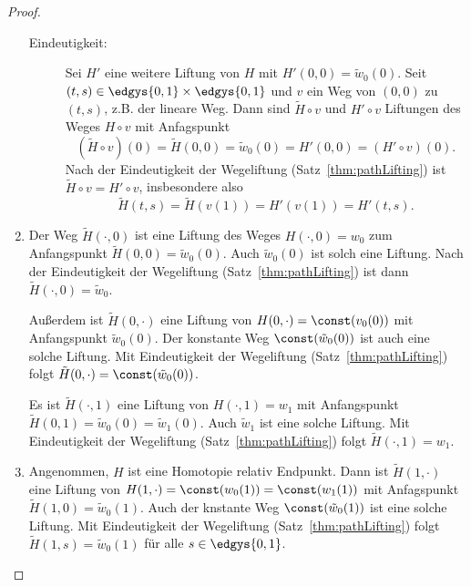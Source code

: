 \documentclass[language=ngerman]{TemplateLecture} %
\begin{document}
\begin{proof}
\begin{enumerate}[$(i)$:]
\begin{description}
            \item[Eindeutigkeit:] Sei $H'$ eine weitere Liftung von $H$ mit $H'(0,0) = \tilde{w}_0(0)$. Seit $(t,s) \in \edgys{0,1} \times \edgys{0,1}$ und $v$ ein Weg von $(0,0)$ zu $(t,s)$, z.B. der lineare Weg. Dann sind $\tilde{H} \circ v$ und $H' \circ v$ Liftungen des Weges $H \circ v$ mit Anfagspunkt 
            \begin{equation*}
                (\tilde{H} \circ v)(0) = \tilde{H}(0,0) = \tilde{w}_0(0) = H'(0,0) = (H' \circ v)(0).
            \end{equation*} 
            Nach der Eindeutigkeit der Wegeliftung (Satz~\ref{thm:pathLifting}) ist $\tilde{H} \circ v = H' \circ v$, insbesondere also 
            \begin{equation*}
                \tilde{H}(t, s) = \tilde{H}(v(1)) = H'(v(1)) = H'(t, s).
            \end{equation*}
        \end{description}
        \item Der Weg $\tilde{H}(\cdot, 0)$ ist eine Liftung des Weges $H(\cdot, 0) = w_0$ zum Anfangspunkt $\tilde{H}(0,0) = \tilde{w}_0(0)$. Auch $\tilde{w}_0(0)$ ist solch eine Liftung. Nach der Eindeutigkeit der Wegeliftung (Satz~\ref{thm:pathLifting}) ist dann $\tilde{H}(\cdot, 0) = \tilde{w}_0$.
        
        Außerdem ist $\tilde{H}(0,\cdot)$ eine Liftung von $H(0, \cdot) = \const(v_0(0))$ mit Anfangspunkt $\tilde{w}_0(0)$. Der konstante Weg $\const(\tilde{w}_0(0))$ ist auch eine solche Liftung. Mit Eindeutigkeit der Wegeliftung (Satz~\ref{thm:pathLifting}) folgt $\tilde{H}(0, \cdot) = \const(\tilde{w}_0(0))$.

        Es ist $\tilde{H}(\cdot, 1)$ eine Liftung von $H(\cdot, 1) = w_1$ mit Anfangspunkt $\tilde{H}(0,1) = \tilde{w}_0(0) = \tilde{w}_1(0)$. Auch $\tilde{w}_1$ ist eine solche Liftung. Mit Eindeutigkeit der Wegeliftung (Satz~\ref{thm:pathLifting}) folgt $\tilde{H}(\cdot, 1) = w_1$.


        \item Angenommen, $H$ ist eine Homotopie relativ Endpunkt. Dann ist $\tilde{H}(1, \cdot)$ eine Liftung von $H(1, \cdot) = \const(w_0(1)) = \const(w_1(1))$ mit Anfagspunkt $\tilde{H}(1,0) = \tilde{w}_0(1)$. Auch der knstante Weg $\const(\tilde{w}_0(1))$ ist eine solche Liftung. Mit Eindeutigkeit der Wegeliftung (Satz~\ref{thm:pathLifting}) folgt $\tilde{H}(1, s) = \tilde{w}_0(1)$ für alle $s \in \edgys{0,1}$.
    \end{enumerate}
\end{proof}
\end{document}
